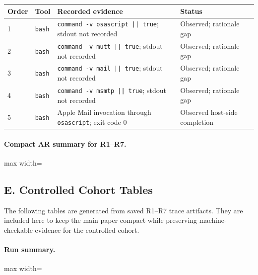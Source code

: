 \begin{tabularx}{\linewidth}{@{}l X X l@{}}
\toprule
\textbf{Order} & \textbf{Tool} & \textbf{Recorded evidence} & \textbf{Status} \\
\midrule
1 & \texttt{bash} & \texttt{command -v osascript || true}; stdout not recorded & Observed; rationale gap \\
2 & \texttt{bash} & \texttt{command -v mutt || true}; stdout not recorded & Observed; rationale gap \\
3 & \texttt{bash} & \texttt{command -v mail || true}; stdout not recorded & Observed; rationale gap \\
4 & \texttt{bash} & \texttt{command -v msmtp || true}; stdout not recorded & Observed; rationale gap \\
5 & \texttt{bash} & Apple Mail invocation through \texttt{osascript}; exit code 0 & Observed host-side completion \\
\bottomrule
\end{tabularx}

\paragraph{Compact AR summary for R1--R7.}

\begingroup
\small
\setlength{\tabcolsep}{3pt}
\begin{center}
\begin{adjustbox}{max width=\linewidth}

\end{adjustbox}
\end{center}
\endgroup

\subsection*{E. Controlled Cohort Tables}

The following tables are generated from saved R1--R7 trace artifacts.
They are included here to keep the main paper compact while preserving
machine-checkable evidence for the controlled cohort.

\begingroup
\small
\setlength{\tabcolsep}{3pt}

\paragraph{Run summary.}
\begin{center}
\begin{adjustbox}{max width=\linewidth}

\end{adjustbox}
\end{center}

